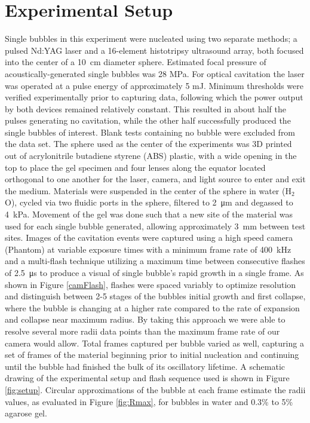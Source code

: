 \documentclass[prl,aps,epsf,twocolumn,superscriptaddress]{revtex4-1}
\begin{document}
\section{Experimental Setup} %
Single bubbles in this experiment were nucleated using two separate methods; a pulsed Nd:YAG laser and a 16-element histotripsy ultrasound array, both focused into the center of a \SI{10}{\cm} diameter sphere. Estimated focal pressure of acoustically-generated single bubbles was 28 MPa. For optical cavitation the laser was operated at a pulse energy of approximately 5 mJ. Minimum thresholds were verified experimentally prior to capturing data, following which the power output by both devices remained relatively constant. This resulted in about half the pulses generating no cavitation, while the other half successfully produced the single bubbles of interest. Blank tests containing no bubble were excluded from the data set. The sphere used as the center of the experiments was 3D printed out of acrylonitrile butadiene styrene (ABS) plastic, with a wide opening in the top to place the gel specimen and four lenses along the equator located orthogonal to one another for the laser, camera, and light source to enter and exit the medium. Materials were suspended in the center of the sphere in water (H$_2$O), cycled via two fluidic ports in the sphere, filtered to \SI{2}{\um} and degassed to \SI{4}{\kPa}. Movement of the gel was done such that a new site of the material was used for each single bubble generated, allowing approximately \SI{3}{\mm} between test sites. Images of the cavitation events were captured using a high speed camera (Phantom) at variable exposure times with a minimum frame rate of \SI{400}{\kHz} and a multi-flash technique utilizing a maximum time between consecutive flashes of \SI{2.5}{\us} to produce a visual of single bubble's rapid growth in a single frame. As shown in Figure \ref{camFlash}, flashes were spaced variably to optimize resolution and distinguish between 2-5 stages of the bubbles initial growth and first collapse, where the bubble is changing at a higher rate compared to the rate of expansion and collapse near maximum radius. By taking this approach we were able to resolve several more radii data points than the maximum frame rate of our camera would allow. Total frames captured per bubble varied as well, capturing a set of frames of the material beginning prior to initial nucleation and continuing until the bubble had finished the bulk of its oscillatory lifetime. A schematic drawing of the experimental setup and flash sequence used is shown in Figure \ref{fig:setup}. Circular approximations of the bubble at each frame estimate the radii values, as evaluated in Figure \ref{fig:Rmax}, for bubbles in water and 0.3\% to 5\% agarose gel. 
\end{document}
